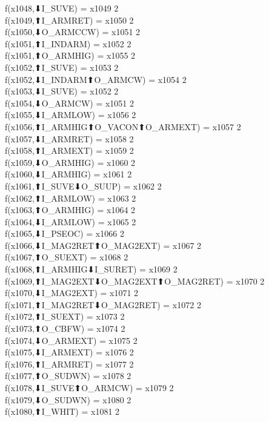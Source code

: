 f(x1048,⬇I_SUVE) = x1049 {2} \\
f(x1049,⬆I_ARMRET) = x1050 {2} \\
f(x1050,⬇O_ARMCCW) = x1051 {2} \\
f(x1051,⬆I_INDARM) = x1052 {2} \\
f(x1051,⬆O_ARMHIG) = x1055 {2} \\
f(x1052,⬆I_SUVE) = x1053 {2} \\
f(x1052,⬇I_INDARM⬆O_ARMCW) = x1054 {2} \\
f(x1053,⬇I_SUVE) = x1052 {2} \\
f(x1054,⬇O_ARMCW) = x1051 {2} \\
f(x1055,⬇I_ARMLOW) = x1056 {2} \\
f(x1056,⬆I_ARMHIG⬆O_VACON⬆O_ARMEXT) = x1057 {2} \\
f(x1057,⬇I_ARMRET) = x1058 {2} \\
f(x1058,⬆I_ARMEXT) = x1059 {2} \\
f(x1059,⬇O_ARMHIG) = x1060 {2} \\
f(x1060,⬇I_ARMHIG) = x1061 {2} \\
f(x1061,⬆I_SUVE⬇O_SUUP) = x1062 {2} \\
f(x1062,⬆I_ARMLOW) = x1063 {2} \\
f(x1063,⬆O_ARMHIG) = x1064 {2} \\
f(x1064,⬇I_ARMLOW) = x1065 {2} \\
f(x1065,⬇I_PSEOC) = x1066 {2} \\
f(x1066,⬇I_MAG2RET⬆O_MAG2EXT) = x1067 {2} \\
f(x1067,⬆O_SUEXT) = x1068 {2} \\
f(x1068,⬆I_ARMHIG⬇I_SURET) = x1069 {2} \\
f(x1069,⬆I_MAG2EXT⬇O_MAG2EXT⬆O_MAG2RET) = x1070 {2} \\
f(x1070,⬇I_MAG2EXT) = x1071 {2} \\
f(x1071,⬆I_MAG2RET⬇O_MAG2RET) = x1072 {2} \\
f(x1072,⬆I_SUEXT) = x1073 {2} \\
f(x1073,⬆O_CBFW) = x1074 {2} \\
f(x1074,⬇O_ARMEXT) = x1075 {2} \\
f(x1075,⬇I_ARMEXT) = x1076 {2} \\
f(x1076,⬆I_ARMRET) = x1077 {2} \\
f(x1077,⬆O_SUDWN) = x1078 {2} \\
f(x1078,⬇I_SUVE⬆O_ARMCW) = x1079 {2} \\
f(x1079,⬇O_SUDWN) = x1080 {2} \\
f(x1080,⬆I_WHIT) = x1081 {2} \\
